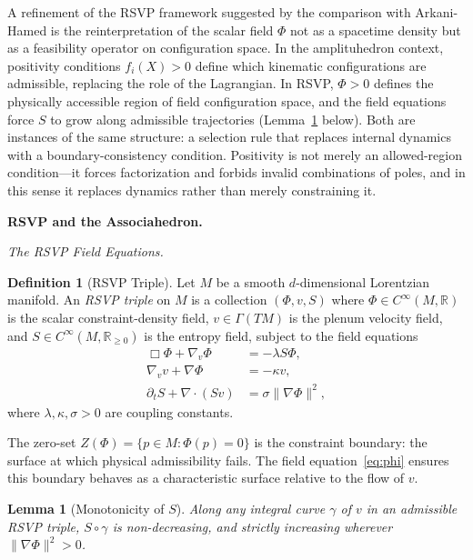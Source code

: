 \documentclass[12pt, oneside]{amsart}
\theoremstyle{plain}
\newtheorem{lemma}[theorem]{Lemma}
\theoremstyle{definition}
\newtheorem{definition}[theorem]{Definition}
\theoremstyle{remark}
\newcommand{\R}{\mathbb{R}}
\newcommand{\Phif}{\Phi}
\newcommand{\vf}{v}
\newcommand{\Sf}{S}
\begin{document}
A refinement of the RSVP framework suggested by the comparison with Arkani-Hamed is the reinterpretation of the scalar field $\Phif$ not as a spacetime density but as a feasibility operator on configuration space. In the amplituhedron context, positivity conditions $f_i(X) > 0$ define which kinematic configurations are admissible, replacing the role of the Lagrangian. In RSVP, $\Phif > 0$ defines the physically accessible region of field configuration space, and the field equations force $\Sf$ to grow along admissible trajectories (Lemma~\ref{lem:S-monotone} below). Both are instances of the same structure: a selection rule that replaces internal dynamics with a boundary-consistency condition. Positivity is not merely an allowed-region condition---it forces factorization and forbids invalid combinations of poles, and in this sense it replaces dynamics rather than merely constraining it.

\bigskip\noindent\textbf{RSVP and the Associahedron.}
\label{sec:rsvp}

\medskip\noindent\textit{The RSVP Field Equations.}

\begin{definition}[RSVP Triple]
Let $M$ be a smooth $d$-dimensional Lorentzian manifold. An \emph{RSVP triple} on $M$ is a collection $(\Phif, \vf, \Sf)$ where $\Phif \in C^\infty(M, \R)$ is the scalar constraint-density field, $\vf \in \Gamma(TM)$ is the plenum velocity field, and $\Sf \in C^\infty(M, \R_{\geq 0})$ is the entropy field, subject to the field equations
\begin{align}
  \Box \Phif + \nabla_\vf \Phif &= -\lambda \Sf \Phif, \label{eq:phi}\\
  \nabla_\vf \vf + \nabla \Phif &= -\kappa \vf, \label{eq:v}\\
  \partial_t \Sf + \nabla \cdot (\Sf \vf) &= \sigma \|\nabla \Phif\|^2, \label{eq:S}
\end{align}
where $\lambda, \kappa, \sigma > 0$ are coupling constants.
\end{definition}

The zero-set $Z(\Phif) = \{p \in M : \Phif(p) = 0\}$ is the constraint boundary: the surface at which physical admissibility fails. The field equation~\eqref{eq:phi} ensures this boundary behaves as a characteristic surface relative to the flow of $\vf$.

\begin{lemma}[Monotonicity of $\Sf$]
\label{lem:S-monotone}
Along any integral curve $\gamma$ of $\vf$ in an admissible RSVP triple, $\Sf \circ \gamma$ is non-decreasing, and strictly increasing wherever $\|\nabla\Phif\|^2 > 0$.
\end{lemma}
\end{document}
